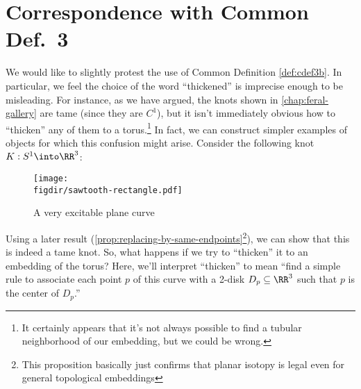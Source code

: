 \section{Correspondence with Common Def.\ 3}\label{sec:corr-cdef-3}
We would like to slightly protest the use of Common Definition
\cref{def:cdef3b}. In particular, we feel the choice of the word
``thickened'' is imprecise enough to be misleading. For instance, as
we have argued, the knots shown in \cref{chap:feral-gallery} are tame
(since they are $C^1$), but it isn't immediately obvious how to
``thicken'' any of them to a torus.\footnote{It certainly appears that
  it's not always possible to find a tubular neighborhood of our
  embedding, but we could be wrong.} In fact, we can construct simpler
examples of objects for which this confusion might arise. Consider the
following knot $K : S^1 \into \RR^3$:
\begin{figure}[H]
  \centering
  \texttt{[image: \\figdir/sawtooth-rectangle.pdf]}
  \caption{A very excitable plane curve}
  \label{fig:excitable-plane-curve}
\end{figure}
Using a later result
(\cref{prop:replacing-by-same-endpoints}\footnote{This proposition
  basically just confirms that planar isotopy is legal even for
  general topological embeddings}), we can show that this is indeed a
tame knot. So, what happens if we try to ``thicken'' it to an
embedding of the torus? Here, we'll interpret ``thicken'' to mean
``find a simple rule to associate each point $p$ of this curve with a
2-disk $D_p \subseteq \RR^3$ such that $p$ is the center of $D_p$.''

